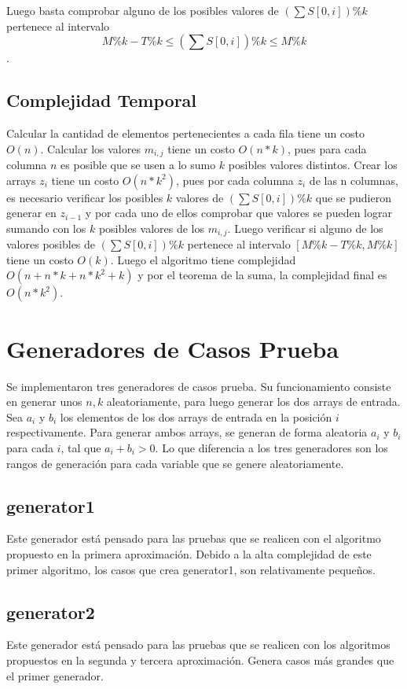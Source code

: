 \documentclass[article]{llncs}
\begin{document}
Luego basta comprobar alguno de los posibles valores de $(\sum S[0,i])\%k$ pertenece al intervalo $$M\%k - T\% k \leq (\sum S[0,i])\%k \leq M \% k$$.

\subsection{Complejidad Temporal}

Calcular la cantidad de elementos pertenecientes a cada fila tiene un costo $O(n)$. Calcular los valores $m_{i,j}$ tiene un costo $O(n*k)$, pues para cada columna $n$ es posible que se usen a lo sumo $k$ posibles valores distintos.
Crear los arrays $z_i$ tiene un costo $O(n*k^2)$, pues por cada columna $z_i$ de las n columnas, es necesario verificar los posibles $k$ valores
de $(\sum S[0,i])\%k$ que se pudieron generar en $z_{i-1}$ y por cada uno de ellos comprobar que valores se pueden lograr sumando con los $k$
posibles valores de los $m_{i,j}$. Luego verificar si alguno de los valores posibles de $(\sum S[0,i])\%k$ pertenece al intervalo $[M\%k - T\% k , M \% k]$ tiene un costo $O(k)$.
Luego el algoritmo 
tiene complejidad $O(n + n*k + n*k^2 + k)$ y por el teorema de la 
suma, la complejidad final es $O(n*k^2)$.

\section{Generadores de Casos Prueba}

Se implementaron tres generadores de casos prueba. Su funcionamiento 
consiste en generar unos $n,k$ aleatoriamente, para luego generar 
los dos arrays de entrada. Sea $a_i$ y $b_i$ los elementos de los dos arrays
de entrada en la posici\'on $i$ respectivamente. Para generar ambos arrays, 
se generan de forma aleatoria $a_i$ y $b_i$ para cada $i$, tal que 
$a_i + b_i > 0$.
Lo que diferencia a los tres generadores son los rangos de generaci\'on para 
cada variable que se genere aleatoriamente.

\subsection{generator1}
Este generador est\'a pensado para las pruebas que se realicen con el algoritmo 
propuesto en la primera aproximaci\'on. Debido a la alta complejidad de 
este primer algoritmo, los casos que crea generator1, son relativamente peque\~{n}os.

\subsection{generator2}
Este generador est\'a pensado para las pruebas que se realicen con los algoritmos 
propuestos en la segunda y tercera aproximaci\'on. Genera casos m\'as grandes 
que el primer generador.
\end{document}
